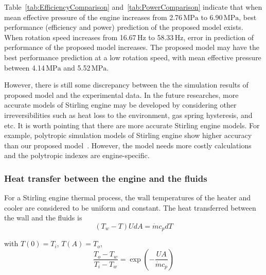 Table~\ref{tab:EfficiencyComparison} and~\ref{tab:PowerComparison} indicate that when mean effective pressure of the engine increases from 2.76$\,\mathrm{MPa}$ to 6.90$\,\mathrm{MPa}$, best performance (efficiency and power) prediction of the proposed model exists. When rotation speed increases from 16.67$\,\mathrm{Hz}$ to 58.33$\,\mathrm{Hz}$, error in prediction of performance of the proposed model increases. The proposed model may have the best performance prediction at a low rotation speed, with mean effective pressure between 4.14$\,\mathrm{MPa}$ and 5.52$\,\mathrm{MPa}$.

However, there is still some discrepancy between the the simulation results of proposed model and the experimental data. In the future researches, more accurate models of Stirling engine may be developed by considering other irreversibilities such as heat loss to the environment, gas spring hysteresis, and etc. It is worth pointing that there are more accurate Stirling engine models. For example, polytropic simulation models of Stirling engine show higher accuracy than our proposed model~\cite{Hosseinzade2015, Babaelahi2015}. However, the model needs more costly calculations and the polytropic indexes are engine-specific.

\subsubsection{Heat transfer between the engine and the fluids}

For a Stirling engine thermal process, the wall temperatures of the heater and cooler are considered to be uniform and constant. The heat transferred between the wall and the fluids is
\begin{equation}
	(T_w-T)UdA = \dot{m}c_pdT
\end{equation}

with $T(0)=T_i$, $T(A)=T_o$,
\begin{equation}
	\frac{T_o-T_w}{T_i-T_w}=\exp(-\frac{UA}{\dot{m}c_p})
\end{equation}

